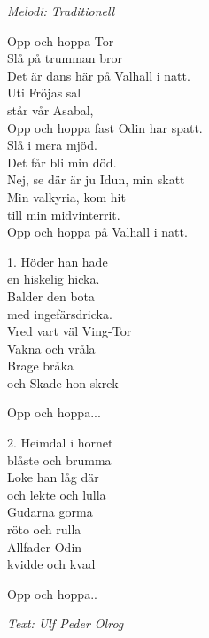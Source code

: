 {\footnotesize\textit{Melodi: Traditionell}}\par
\vspace{10pt}
Opp och hoppa Tor\\
Slå på trumman bror\\
Det är dans här på Valhall i natt.\\
Uti Fröjas sal\\
står vår Asabal,\\
Opp och hoppa fast Odin har spatt.\\
Slå i mera mjöd.\\
Det får bli min död.\\
Nej, se där är ju Idun, min skatt\\
Min valkyria, kom hit\\
till min midvinterrit.\\
Opp och hoppa på Valhall i natt.\par
\vspace{10pt}
1. Höder han hade\\
en hiskelig hicka.\\
Balder den bota\\
med ingefärsdricka.\\
Vred vart väl Ving-Tor\\
Vakna och vråla\\
Brage bråka\\
och Skade hon skrek\par
\vspace{10pt}
Opp och hoppa...\par
\vspace{10pt}
2. Heimdal i hornet\\
blåste och brumma\\
Loke han låg där\\
och lekte och lulla\\
Gudarna gorma\\
röto och rulla\\
Allfader Odin\\
kvidde och kvad\par
\vspace{10pt}
Opp och hoppa..
\par
\vspace{10pt}
{\footnotesize\textit{Text: Ulf Peder Olrog}}
